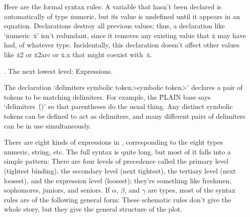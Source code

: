 Here are the formal syntax rules:
A variable that hasn't been declared is automatically of type \.{numeric},
but its value is undefined until it appears in an equation. Declarations
destroy all previous values; thus, a declaration like `\.{numeric}~\.x'
isn't redundant, since it removes any existing value that \.x may have
had, of whatever type.  Incidentally, this declaration doesn't affect
other values like \.{x2} or \.{x2arc} or \.{x.x} that might coexist with~\.x.

. The next lowest level: Expressions.

The declaration `\.{delimiters} \<symbolic token>\<symbolic token>'
declares a pair of tokens to be matching delimiters. For example, the
\.{PLAIN} base says `\.{delimiters}~\.{()}' so that parentheses do
the usual thing. Any distinct symbolic tokens can be defined to act
as delimiters, and many different pairs of delimiters can be
in use simultaneously.

There are eight kinds of expressions in \MF, corresponding to the
eight types numeric, string, etc. The full syntax is quite long,
but most of it falls into a simple pattern: There are four levels
of precedence called the primary level (tightest binding), the
secondary level (next tightest), the tertiary level (next loosest),
and the expression level (loosest); they're something like freshmen,
sophomores, juniors, and seniors. If $\alpha$, $\beta$, and
$\gamma$ are types, most of the syntax rules are of the following
general form:
These schematic rules don't give the whole story, but they give the
general structure of the plot.

